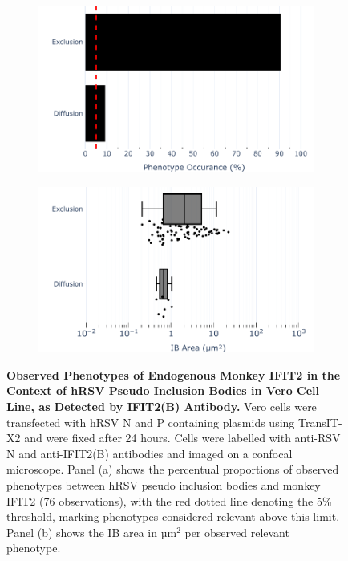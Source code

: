 \begin{figure}
    \begin{subfigure}{0.495\textwidth}
        \caption{}
        \includegraphics[width=1\linewidth]{09. Chapter 4/Figs/01. pIB/03. IFIT2/03. IFIT2B/04. bar_i2b_vero_hnhp.pdf} 
    \end{subfigure}
    \begin{subfigure}{0.495\textwidth}
        \caption{}
        \includegraphics[width=1\linewidth]{09. Chapter 4/Figs/01. pIB/03. IFIT2/03. IFIT2B/05. box_i2b_vero_hnhp.pdf}
    \end{subfigure}
    \caption[Observed Phenotypes of Endogenous Monkey IFIT2 in the Context of hRSV Pseudo Inclusion Bodies in Vero Cell Line, as Detected by IFIT2(B) Antibody.]{\textbf{Observed Phenotypes of Endogenous Monkey IFIT2 in the Context of hRSV Pseudo Inclusion Bodies in Vero Cell Line, as Detected by IFIT2(B) Antibody.} Vero cells were transfected with hRSV N and P containing plasmids using TransIT-X2 and were fixed after 24 hours. Cells were labelled with anti-RSV N and anti-IFIT2(B) antibodies and imaged on a confocal microscope. Panel (a) shows the percentual proportions of observed phenotypes between hRSV pseudo inclusion bodies and monkey IFIT2 (76 observations), with the red dotted line denoting the 5\% threshold, marking phenotypes considered relevant above this limit. Panel (b) shows the IB area in \(\mbox{µm}^2\) per observed relevant phenotype.}
    \label{fig:Observed Phenotypes of Endogenous Monkey IFIT2 in the Context of hRSV Pseudo Inclusion Bodies in Vero Cell Line, as Detected by IFIT2(B) Antibody}
\end{figure}

